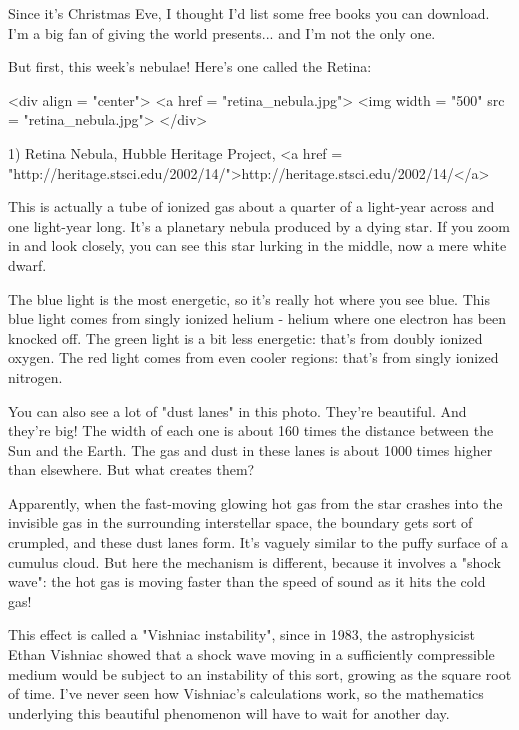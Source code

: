 

Since it's Christmas Eve, I thought I'd list some free books you 
can download.  I'm a big fan of giving the world presents...
and I'm not the only one.

But first, this week's nebulae!  Here's one called the Retina:

<div align = "center">
<a href = "retina_nebula.jpg">
<img width = "500" src = "retina_nebula.jpg">
</div>

1) Retina Nebula, Hubble Heritage Project, <a href =
"http://heritage.stsci.edu/2002/14/">http://heritage.stsci.edu/2002/14/</a>

This is actually a tube of ionized gas about a quarter of a light-year 
across and one light-year long.  It's a planetary nebula produced
by a dying star.   If you zoom in and look closely, you can see this
star lurking in the middle, now a mere white dwarf.

The blue light is the most energetic, so it's really hot where you see
blue.   This blue light comes from singly ionized helium - helium where
one electron has been knocked off.  The green light is a bit less 
energetic: that's from doubly ionized oxygen.  The red light comes from 
even cooler regions: that's from singly ionized nitrogen.

You can also see a lot of "dust lanes" in this photo.  They're
beautiful.  And they're big!  The width of each one is about 160 times
the distance between the Sun and the Earth.  The gas and dust in these
lanes is about 1000 times higher than elsewhere.  But what creates them?   

Apparently, when the fast-moving glowing hot gas from the star crashes
into the invisible gas in the surrounding interstellar space, the
boundary gets sort of crumpled, and these dust lanes form.  It's
vaguely similar to the puffy surface of a cumulus cloud.  But here the
mechanism is different, because it involves a "shock wave":
the hot gas is moving faster than the speed of sound as it hits the
cold gas!

This effect is called a "Vishniac instability", since in
1983, the astrophysicist Ethan Vishniac showed that a shock wave
moving in a sufficiently compressible medium would be subject to an
instability of this sort, growing as the square root of time.  I've
never seen how Vishniac's calculations work, so the mathematics
underlying this beautiful phenomenon will have to wait for another
day.

